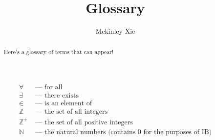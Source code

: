 \documentclass[a4paper]{scrartcl}
\title{Glossary}
\author{Mckinley Xie}
\newcommand{\term}[2]{#1 &\text{ ---  #2} \\}
\begin{document}
\maketitle
\begin{abstract}
	Here's a glossary of terms that can appear!
\end{abstract}
\begin{align*}
	\term{\forall}{for all} 
	\term{\exists}{there exists} 
	\term{\in}{is an element of}
	\term{\mathbb{Z}}{the set of all integers}
	\term{\mathbb{Z}^+}{the set of all positive integers}
	\term{\mathbb{N}}{the natural numbers (contains 0 for the purposes of IB)}
\end{align*}
\end{document}
